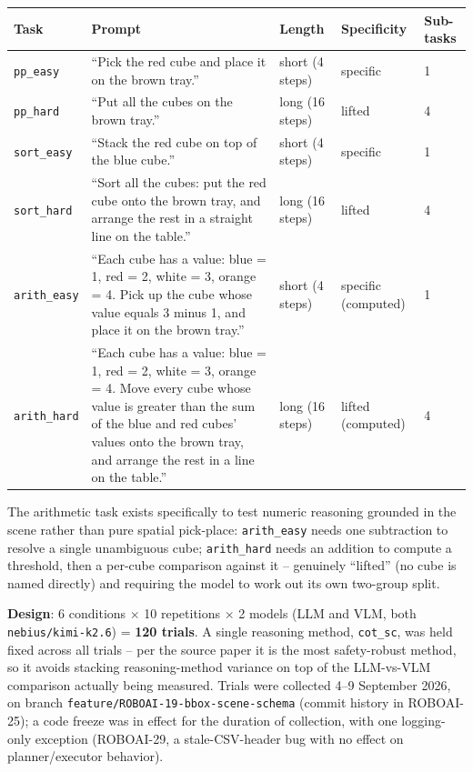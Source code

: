 \begin{longtable}{@{}p{1.6cm}p{6.7cm}p{1.5cm}p{1.6cm}p{1.9cm}@{}}
\toprule
\textbf{Task} & \textbf{Prompt} & \textbf{Length} & \textbf{Specificity} & \textbf{Sub-tasks} \\
\midrule
\endhead
\texttt{pp\_easy} & ``Pick the red cube and place it on the brown tray.'' &
  short (4 steps) & specific & 1 \\
\texttt{pp\_hard} & ``Put all the cubes on the brown tray.'' &
  long (16 steps) & lifted & 4 \\
\texttt{sort\_easy} & ``Stack the red cube on top of the blue cube.'' &
  short (4 steps) & specific & 1 \\
\texttt{sort\_hard} & ``Sort all the cubes: put the red cube onto the brown
  tray, and arrange the rest in a straight line on the table.'' &
  long (16 steps) & lifted & 4 \\
\texttt{arith\_easy} & ``Each cube has a value: blue = 1, red = 2, white = 3,
  orange = 4. Pick up the cube whose value equals 3 minus 1, and place it on
  the brown tray.'' & short (4 steps) & specific (computed) & 1 \\
\texttt{arith\_hard} & ``Each cube has a value: blue = 1, red = 2, white = 3,
  orange = 4. Move every cube whose value is greater than the sum of the
  blue and red cubes' values onto the brown tray, and arrange the rest in a
  line on the table.'' & long (16 steps) & lifted (computed) & 4 \\
\bottomrule
\end{longtable}

\noindent The arithmetic task exists specifically to test numeric reasoning
grounded in the scene rather than pure spatial pick-place: \texttt{arith\_easy}
needs one subtraction to resolve a single unambiguous cube; \texttt{arith\_hard}
needs an addition to compute a threshold, then a per-cube comparison against
it -- genuinely ``lifted'' (no cube is named directly) and requiring the
model to work out its own two-group split.

\textbf{Design}: 6 conditions $\times$ 10 repetitions $\times$ 2 models
(LLM and VLM, both \texttt{nebius/kimi-k2.6}) = \textbf{120 trials}. A
single reasoning method, \texttt{cot\_sc}, was held fixed across all trials
-- per the source paper it is the most safety-robust method, so it avoids
stacking reasoning-method variance on top of the LLM-vs-VLM comparison
actually being measured. Trials were collected 4--9 September 2026, on
branch \texttt{feature/ROBOAI-19-bbox-scene-schema} (commit history in
ROBOAI-25); a code freeze was in effect for the duration of collection, with
one logging-only exception (ROBOAI-29, a stale-CSV-header bug with no effect
on planner/executor behavior).


